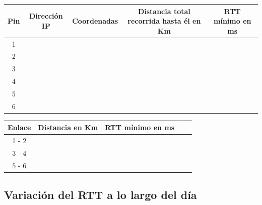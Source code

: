 \noindent \begin{center} \begin{tabular}{| c | c | c | c | c |} \hline 
Pin 	& 	 Dirección IP 	 & 	 Coordenadas 		 & 	 Distancia total recorrida hasta él en Km 	 & 	 RTT mínimo en ms 	\\ \hline 
1 	 	& 	  				 & 	 					 & 	 											 & 	 	 				\\ \hline 
2 		& 	 				 & 	 				 	 & 	 			 								 & 	 		 			\\ \hline 
3 	 	& 	 			 	 & 	  					 & 	  											 & 	 					\\ \hline 
4 	 	& 	  				 & 	  					 & 	  											 & 	  					\\ \hline 
5 	 	& 	  				 & 	  					 & 	  											 & 	  					\\ \hline 
6 	 	& 	  				 & 	 				 	 & 	  											 & 	  					\\ \hline 
\end{tabular} \end{center}

\noindent \begin{center} \begin{tabular}{| c | c | c | c | c |} \hline 
Enlace 	 &	Distancia en Km 	& 	RTT mínimo en ms	\\ \hline 
1 - 2	 &			 	 		& 						\\ \hline 
3 - 4 	 & 		 				& 						\\ \hline 
5 - 6 	 & 			 			&						\\ \hline 
\end{tabular} \end{center}

\subsection{Variación del RTT a lo largo del día}

